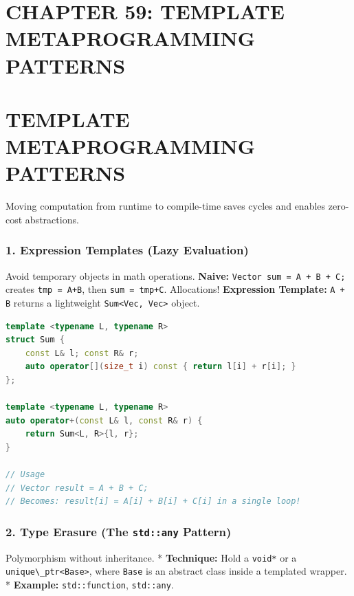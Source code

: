 \hypertarget{chapter-59-template-metaprogramming-patterns}{%
\section{CHAPTER 59: TEMPLATE METAPROGRAMMING
PATTERNS}\label{chapter-59-template-metaprogramming-patterns}}

\hypertarget{template-metaprogramming-patterns}{%
\section{TEMPLATE METAPROGRAMMING
PATTERNS}\label{template-metaprogramming-patterns}}

Moving computation from runtime to compile-time saves cycles and enables
zero-cost abstractions.

\hypertarget{expression-templates-lazy-evaluation}{%
\subsubsection{1. Expression Templates (Lazy
Evaluation)}\label{expression-templates-lazy-evaluation}}

Avoid temporary objects in math operations. \textbf{Naive:}
\passthrough{\lstinline!Vector sum = A + B + C;!} creates
\passthrough{\lstinline!tmp = A+B!}, then
\passthrough{\lstinline!sum = tmp+C!}. Allocations! \textbf{Expression
Template:} \passthrough{\lstinline!A + B!} returns a lightweight
\passthrough{\lstinline!Sum<Vec, Vec>!} object.

\begin{lstlisting}[language={C++}]
template <typename L, typename R>
struct Sum {
    const L& l; const R& r;
    auto operator[](size_t i) const { return l[i] + r[i]; }
};

template <typename L, typename R>
auto operator+(const L& l, const R& r) {
    return Sum<L, R>{l, r};
}

// Usage
// Vector result = A + B + C;
// Becomes: result[i] = A[i] + B[i] + C[i] in a single loop!
\end{lstlisting}

\hypertarget{type-erasure-the-stdany-pattern}{%
\subsubsection{\texorpdfstring{2. Type Erasure (The \texttt{std::any}
Pattern)}{2. Type Erasure (The std::any Pattern)}}\label{type-erasure-the-stdany-pattern}}

Polymorphism without inheritance. * \textbf{Technique:} Hold a
\passthrough{\lstinline!void*!} or a
\passthrough{\lstinline!unique\_ptr<Base>!}, where
\passthrough{\lstinline!Base!} is an abstract class inside a templated
wrapper. * \textbf{Example:} \passthrough{\lstinline!std::function!},
\passthrough{\lstinline!std::any!}.

